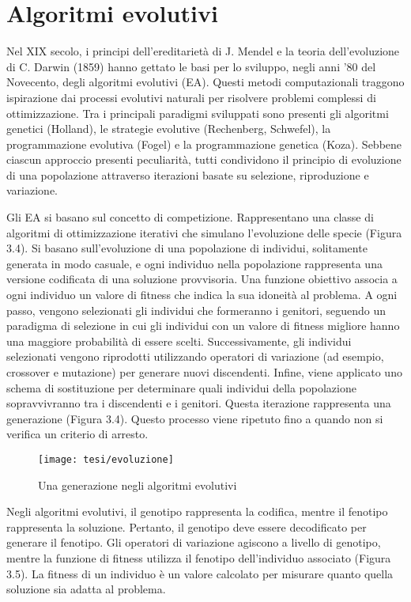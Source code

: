 \section{Algoritmi evolutivi} \hypertarget{ea}{}

Nel XIX secolo, i principi dell'ereditarietà di J. Mendel e la teoria dell'evoluzione di C. Darwin (1859) hanno gettato le basi per lo sviluppo, negli anni '80 del Novecento, degli algoritmi evolutivi (EA). Questi metodi computazionali traggono ispirazione dai processi evolutivi naturali per risolvere problemi complessi di ottimizzazione. Tra i principali paradigmi sviluppati sono presenti gli algoritmi genetici (Holland), le strategie evolutive (Rechenberg, Schwefel), la programmazione evolutiva (Fogel) e la programmazione genetica (Koza). Sebbene ciascun approccio presenti peculiarità, tutti condividono il principio di evoluzione di una popolazione attraverso iterazioni basate su selezione, riproduzione e variazione.

Gli EA si basano sul concetto di competizione. Rappresentano una classe di algoritmi di ottimizzazione iterativi che simulano l'evoluzione delle specie (Figura 3.4). Si basano sull'evoluzione di una popolazione di individui, solitamente generata in modo casuale, e ogni individuo nella popolazione rappresenta una versione codificata di una soluzione provvisoria. Una funzione obiettivo associa a ogni individuo un valore di fitness che indica la sua idoneità al problema. A ogni passo, vengono selezionati gli individui che formeranno i genitori, seguendo un paradigma di selezione in cui gli individui con un valore di fitness migliore hanno una maggiore probabilità di essere scelti. Successivamente, gli individui selezionati vengono riprodotti utilizzando operatori di variazione (ad esempio, crossover e mutazione) per generare nuovi discendenti. Infine, viene applicato uno schema di sostituzione per determinare quali individui della popolazione sopravvivranno tra i discendenti e i genitori. Questa iterazione rappresenta una generazione (Figura 3.4). Questo processo viene ripetuto fino a quando non si verifica un criterio di arresto.

\begin{figure}[!ht] 
    \centering 
    \texttt{[image: tesi/evoluzione]} 
    \caption{Una generazione negli algoritmi evolutivi}
\end{figure}

Negli algoritmi evolutivi, il genotipo rappresenta la codifica, mentre il fenotipo rappresenta la soluzione. Pertanto, il genotipo deve essere decodificato per generare il fenotipo. Gli operatori di variazione agiscono a livello di genotipo, mentre la funzione di fitness utilizza il fenotipo dell'individuo associato (Figura 3.5). La fitness di un individuo è un valore calcolato per misurare quanto quella soluzione sia adatta al problema. 

